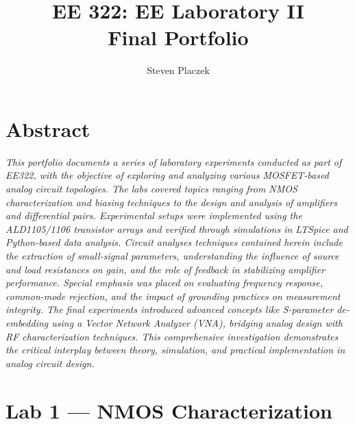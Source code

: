 \documentclass[12pt]{report}
\title{EE 322: EE Laboratory II \\
Final Portfolio}
\author{Steven Placzek}
\begin{document}


\chapter*{Abstract}
\thispagestyle{empty}
\emph{This portfolio documents a series of laboratory experiments conducted as part of EE322, with the objective of exploring and analyzing various MOSFET-based analog circuit topologies. The labs covered topics ranging from NMOS characterization and biasing techniques to the design and analysis of amplifiers and differential pairs. Experimental setups were implemented using the ALD1105/1106 transistor arrays and verified through simulations in LTSpice and Python-based data analysis. Circuit analyses techniques contained herein include the extraction of small-signal parameters, understanding the influence of source and load resistances on gain, and the role of feedback in stabilizing amplifier performance. Special emphasis was placed on evaluating frequency response, common-mode rejection, and the impact of grounding practices on measurement integrity. The final experiments introduced advanced concepts like S-parameter de-embedding using a Vector Network Analyzer (VNA), bridging analog design with RF characterization techniques. This comprehensive investigation demonstrates the critical interplay between theory, simulation, and practical implementation in analog circuit design.}








\singlespacing
{}
\tableofcontents

\listoffigures{}
\listoftables{}

\normalsize
\newpage
{}
\doublespacing
\setlength{\parindent}{1.5em}
\chapter{Lab 1 — NMOS Characterization}

\end{document}
